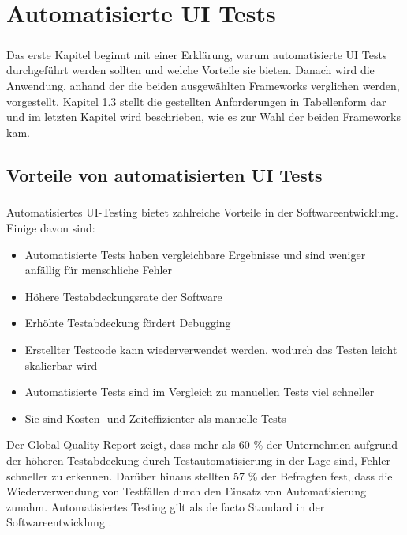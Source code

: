 \chapter{Automatisierte UI Tests}
	\paragraph{} Das erste Kapitel beginnt mit einer Erklärung, warum automatisierte UI Tests durchgeführt werden sollten und welche Vorteile sie bieten. Danach wird die Anwendung, anhand der die beiden ausgewählten Frameworks verglichen werden, vorgestellt. Kapitel 1.3 stellt die gestellten Anforderungen in Tabellenform dar und im letzten Kapitel wird beschrieben, wie es zur Wahl der beiden Frameworks kam.
	\section{Vorteile von automatisierten UI Tests} 
		\paragraph{} Automatisiertes UI-Testing bietet zahlreiche Vorteile in der Softwareentwicklung. Einige davon sind:
		
		\begin{itemize}
			\item Automatisierte Tests haben vergleichbare Ergebnisse und sind weniger anfällig für menschliche Fehler
			\item Höhere Testabdeckungsrate der Software
			\item Erhöhte Testabdeckung fördert Debugging
			\item Erstellter Testcode kann wiederverwendet werden, wodurch das Testen leicht skalierbar wird
			\item Automatisierte Tests sind im Vergleich zu manuellen Tests viel schneller
			\item Sie sind Kosten- und Zeiteffizienter als manuelle Tests
		\end{itemize}		
		
		Der Global Quality Report zeigt, dass mehr als 60 \% der Unternehmen aufgrund der höheren Testabdeckung durch Testautomatisierung in der Lage sind, Fehler schneller zu erkennen. Darüber hinaus stellten 57 \% der Befragten fest, dass die Wiederverwendung von Testfällen durch den Einsatz von Automatisierung zunahm. Automatisiertes Testing gilt als de facto Standard in der Softwareentwicklung \cite{capgemini2021microfocus}. 
		
